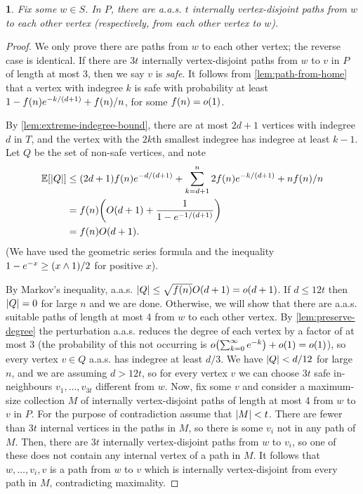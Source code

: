 \documentclass[11pt,english]{article}
\theoremstyle{plain}
\theoremstyle{definition}
\theoremstyle{definition}
\theoremstyle{plain}
\theoremstyle{plain}
\theoremstyle{plain}
\newtheorem{lem}[thm]{\protect\lemmaname}
\theoremstyle{plain}
\theoremstyle{remark}
\theoremstyle{remark}
\let\originalleft\left
\let\originalright\right
\renewcommand{\left}{\mathopen{}\mathclose\bgroup\originalleft}
\renewcommand{\right}{\aftergroup\egroup\originalright}
\providecommand{\lemmaname}{Lemma}
\begin{document}
\begin{lem}
\label{lem:lots-of-paths}Fix some $w\in S$. In $P$, there are a.a.s.
$t$ internally vertex-disjoint paths from $w$ to each other vertex
(respectively, from each other vertex to $w$).\end{lem}
\begin{proof}
We only prove there are paths from $w$ to each other vertex; the
reverse case is identical. If there are $3t$ internally vertex-disjoint
paths from $w$ to $v$ in $P$ of length at most 3, then we say $v$
is \emph{safe}. It follows from \ref{lem:path-from-home} that a vertex
with indegree $k$ is safe with probability at least $1-f\left(n\right)e^{-k/\left(d+1\right)}+f\left(n\right)/n$,
for some $f\left(n\right)=o\left(1\right)$.

By \ref{lem:extreme-indegree-bound}, there are at most $2d+1$ vertices
with indegree $d$ in $T$, and the vertex with the $2k$th smallest
indegree has indegree at least $k-1$. Let $Q$ be the set of non-safe
vertices, and note 
\begin{align*}
\E\left[\left|Q\right|\right] & \le\left(2d+1\right)f\left(n\right)e^{-d/\left(d+1\right)}+\sum_{k=d+1}^{n}2f\left(n\right)e^{-k/\left(d+1\right)}+nf\left(n\right)/n\\
 & =f\left(n\right)\left(O\left(d+1\right)+\frac{1}{1-e^{-1/\left(d+1\right)}}\right)\\
 & =f\left(n\right)O\left(d+1\right).
\end{align*}
(We have used the geometric series formula and the inequality $1-e^{-x}\ge\left(x\land1\right)/2$
for positive $x$).

By Markov's inequality, a.a.s. $\left|Q\right|\le\sqrt{f\left(n\right)}O\left(d+1\right)=o\left(d+1\right)$.
If $d\le12t$ then $\left|Q\right|=0$ for large $n$ and we are done. Otherwise, we will show that there are a.a.s. suitable paths of length at most 4 from $w$ to each other vertex. By \ref{lem:preserve-degree} the perturbation a.a.s. reduces the degree of each vertex by a factor of at most 3 (the probability of this not occurring is $o\left(\sum_{k=0}^\infty e^{-k}\right)+o\left(1\right)=o\left(1\right)$), so every vertex $v\in Q$ a.a.s. has indegree at least $d/3$. We have $\left|Q\right|<d/12$ for large $n$, and we are assuming $d>12t$, so for every vertex $v$ we can choose $3t$ safe in-neighbours $v_{1},\dots,v_{3t}$ different from $w$. Now, fix some $v$ and consider a maximum-size collection $M$ of internally vertex-disjoint paths of length at most 4 from $w$ to $v$ in $P$. For the purpose of contradiction assume that $\left|M\right|<t$. There are fewer than $3t$ internal vertices in the paths in $M$, so there is some $v_{i}$ not in any path of $M$. Then, there are $3t$ internally vertex-disjoint paths from $w$ to $v_{i}$, so one of these does not contain any
internal vertex of a path in $M$. It follows that $w,\dots,v_{i},v$ is a path from $w$ to $v$ which is
internally vertex-disjoint from every path in $M$, contradicting maximality.
\end{proof}
\end{document}
